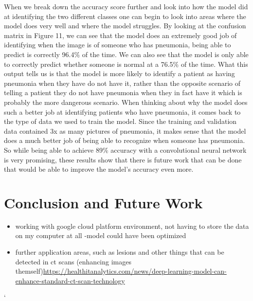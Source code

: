 \documentclass[12pt]{article}
\providecommand{\tightlist}{%
  \setlength{\itemsep}{0pt}\setlength{\parskip}{0pt}}
\begin{document}
When we break down the accuracy score further and look into how the
model did at identifying the two different classes one can begin to look
into areas where the model does very well and where the model struggles.
By looking at the confusion matrix in Figure 11, we can see that the
model does an extremely good job of identifying when the image is of
someone who has pneumonia, being able to predict is correctly 96.4\% of
the time. We can also see that the model is only able to correctly
predict whether someone is normal at a 76.5\% of the time. What this
output tells us is that the model is more likely to identify a patient
as having pneumonia when they have do not have it, rather than the
opposite scenario of telling a patient they do not have pneumonia when
they in fact have it which is probably the more dangerous scenario. When
thinking about why the model does such a better job at identifying
patients who have pneumonia, it comes back to the type of data we used
to train the model. Since the training and validation data contained 3x
as many pictures of pneumonia, it makes sense that the model does a much
better job of being able to recognize when someone has pneumonia. So
while being able to achieve 89\% accuracy with a convolutional neural
network is very promising, these results show that there is future work
that can be done that would be able to improve the model's accuracy even
more.

\hypertarget{conclusion-and-future-work}{%
\section{Conclusion and Future Work}\label{conclusion-and-future-work}}

\begin{itemize}
\tightlist
\item
  working with google cloud platform environment, not having to store
  the data on my computer at all -model could have been optimized
\item
  further application areas, such as lesions and other things that can
  be detected in ct scans (enhancing images
  themself)\url{https://healthitanalytics.com/news/deep-learning-model-can-enhance-standard-ct-scan-technology}
\end{itemize}

`



\end{document}
